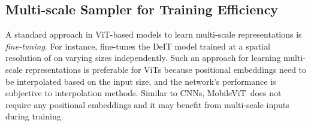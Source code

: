 \documentclass[preprint]{article} \usepackage{iclr2022_conference,times}
\newcommand{\arch}{MobileViT}
\begin{document}
\subsection{Multi-scale Sampler for Training Efficiency} 
\label{ssec:multi_scale_sampler}

A standard approach in ViT-based models to learn multi-scale representations is \emph{fine-tuning}. For instance, \citet{touvron2021training} fine-tunes the DeIT model trained at a spatial resolution of  on varying sizes independently. Such an approach for learning multi-scale representations is preferable for ViTs because positional embeddings need to be interpolated based on the input size, and the network's performance is subjective to interpolation methods. Similar to CNNs, \arch~does not require any positional embeddings and it may benefit from multi-scale inputs during training. 
\end{document}

